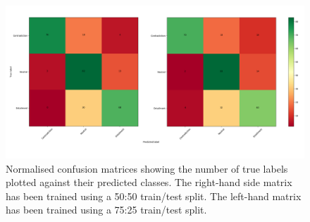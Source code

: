 \documentclass[a4paper,11pt]{article}
\begin{document}
\begin{figure}
  \begin{center}
    \includegraphics[width=\linewidth]{cm}
    \caption{Normalised confusion matrices showing the number of true labels plotted against their predicted classes. The right-hand side matrix has been trained using a 50:50 train/test split. The left-hand matrix has been trained using a 75:25 train/test split.}
    \label{fig:}
  \end{center}
\end{figure}





\clearpage
{}

\end{document}
